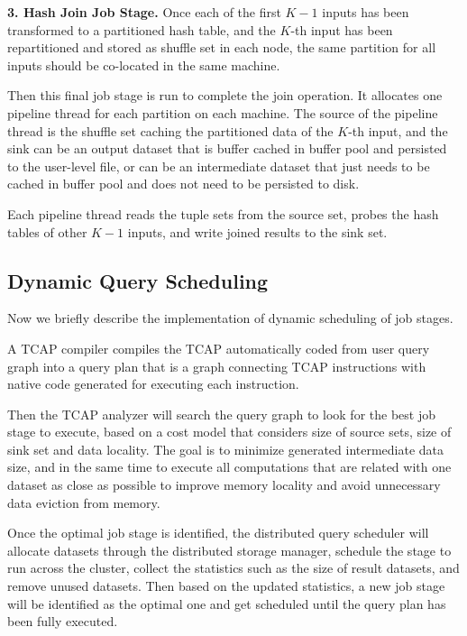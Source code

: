 \vspace{5pt}
{\bf 3. Hash Join Job Stage.} Once each of the first $K-1$ inputs has been transformed to a partitioned hash table, and the $K$-th input has been repartitioned and stored as shuffle set in each node, the same partition for all inputs should be co-located in the same machine. 

Then this final job stage is run to complete the join operation. It allocates one pipeline thread for each partition on each machine. The source of the pipeline thread is the shuffle set caching the partitioned data of the $K$-th input, and the sink can be an output dataset that is buffer cached in buffer pool and persisted to the user-level file, or can be an intermediate dataset that just needs to be cached in buffer pool and does not need to be persisted to disk. 

Each pipeline thread reads the tuple sets from the source set, probes the hash tables of other $K-1$ inputs, and write joined results to the sink set.

\subsection{Dynamic Query Scheduling}
Now we briefly describe the implementation of dynamic scheduling of job stages. 

A TCAP compiler compiles the TCAP automatically coded from user query graph into a query plan that is a graph connecting TCAP instructions with native code generated for executing each instruction. 

Then the TCAP analyzer will search the query graph to look for the best job stage to execute, based on a cost model that considers size of source sets, size of sink set and data locality. The goal is to minimize generated intermediate data size,  and in the same time to execute all computations that are related with one dataset as close as possible to improve memory locality and avoid unnecessary data eviction from memory.

Once the optimal job stage is identified, the distributed query scheduler will allocate datasets through the distributed storage manager, schedule the stage to run across the cluster, collect the statistics such as the size of result datasets, and remove unused datasets. Then based on the updated statistics, a new job stage will be identified as the optimal one and get scheduled until the query plan has been fully executed.
